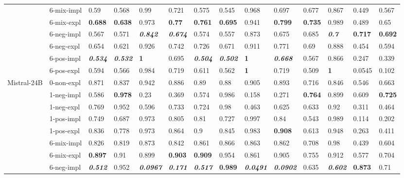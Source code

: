 \begin{tabular}{ll|llll|llll|llll}
 & 6-mix-impl & 0.59 & 0.568 & 0.99 & 0.721 & 0.575 & 0.545 & 0.968 & 0.697 & 0.677 & 0.867 & 0.449 & 0.567 \\
 & 6-mix-expl & \bfseries 0.688 & \bfseries 0.638 & 0.973 & \bfseries 0.77 & \bfseries 0.761 & \bfseries 0.695 & 0.941 & \bfseries 0.799 & \bfseries 0.735 & 0.989 & 0.489 & 0.65 \\
 & 6-neg-impl & 0.567 & 0.571 & \bfseries \itshape 0.842 & \bfseries \itshape 0.674 & 0.574 & 0.557 & 0.873 & 0.675 & 0.685 & \bfseries \itshape 0.7 & \bfseries 0.717 & \bfseries 0.692 \\
 & 6-neg-expl & 0.654 & 0.621 & 0.926 & 0.742 & 0.726 & 0.671 & 0.911 & 0.771 & 0.69 & 0.888 & 0.454 & 0.594 \\
 & 6-pos-impl & \bfseries \itshape 0.534 & \bfseries \itshape 0.532 & \bfseries 1 & 0.695 & \bfseries \itshape 0.504 & \bfseries \itshape 0.502 & \bfseries 1 & \bfseries \itshape 0.668 & 0.567 & 0.866 & 0.247 & 0.339 \\
 & 6-pos-expl & 0.594 & 0.566 & 0.984 & 0.719 & 0.611 & 0.562 & \bfseries 1 & 0.719 & 0.509 & \bfseries 1 & 0.0545 & 0.102 \\
\midrule
\multirow[t]{11}{*}{Mistral-24B} & 0-non-expl & 0.871 & 0.837 & 0.942 & 0.886 & 0.89 & 0.88 & 0.905 & 0.893 & 0.716 & 0.846 & 0.546 & 0.663 \\
 & 1-neg-impl & 0.586 & \bfseries 0.978 & 0.23 & 0.369 & 0.574 & 0.986 & 0.158 & 0.271 & \bfseries 0.764 & 0.899 & 0.609 & \bfseries 0.725 \\
 & 1-neg-expl & 0.769 & 0.952 & 0.596 & 0.733 & 0.724 & 0.98 & 0.463 & 0.625 & 0.633 & 0.92 & 0.311 & 0.464 \\
 & 1-pos-impl & 0.749 & 0.687 & 0.973 & 0.805 & 0.81 & 0.727 & 0.997 & 0.84 & 0.543 & 0.989 & 0.114 & 0.202 \\
 & 1-pos-expl & 0.836 & 0.778 & 0.973 & 0.864 & 0.9 & 0.845 & 0.983 & \bfseries 0.908 & 0.613 & 0.948 & 0.263 & 0.411 \\
 & 6-mix-impl & 0.826 & 0.819 & 0.873 & 0.842 & 0.861 & 0.866 & 0.863 & 0.862 & 0.708 & 0.98 & 0.439 & 0.604 \\
 & 6-mix-expl & \bfseries 0.897 & 0.91 & 0.899 & \bfseries 0.903 & \bfseries 0.909 & 0.954 & 0.861 & 0.905 & 0.755 & 0.912 & 0.577 & 0.704 \\
 & 6-neg-impl & \bfseries \itshape 0.512 & 0.952 & \bfseries \itshape 0.0967 & \bfseries \itshape 0.171 & \bfseries \itshape 0.517 & \bfseries 0.989 & \bfseries \itshape 0.0491 & \bfseries \itshape 0.0902 & 0.635 & \bfseries \itshape 0.602 & \bfseries 0.873 & 0.71 \\

\end{tabular}
